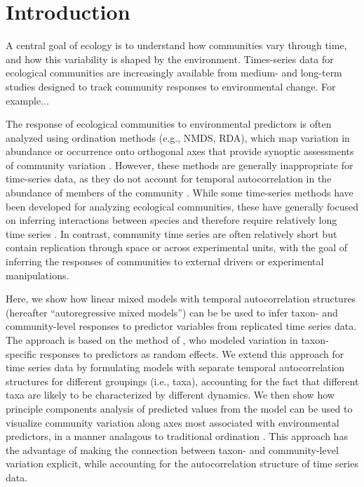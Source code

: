 \section*{Introduction}

A central goal of ecology is to understand how communities vary through time, and
how this variability is shaped by the environment.
Times-series data for ecological communities are increasingly available
from medium- and long-term studies designed to track community responses
to environmental change. For example...

The response of ecological communities to environmental predictors is often analyzed using
ordination methods (e.g., NMDS, RDA),
which map variation in abundance or occurrence onto orthogonal
axes that provide synoptic assessments of community variation \citep{Mcgarigal2013}.
However, these methods are generally inappropriate for time-series data,
as they do not account
for temporal autocorrelation in the abundance of members of the community \citep{Ives2006}.
While some time-series methods have been developed for analyzing ecological communities,
these have generally focused on inferring interactions between species and therefore
require relatively long time series \citep{Ives1999, Hampton2013}.
In contrast, community time series are often relatively short but
contain replication through space or across experimental units, with the goal of inferring
the responses of communities to external drivers or experimental manipulations.

Here, we show how linear mixed models with temporal autocorrelation structures
(hereafter ``autoregressive mixed models'') can be be used to infer taxon- and
community-level responses to predictor variables from replicated time series data. The
approach is based on the method of \cite{Jackson2012},
who modeled variation in taxon-specific responses to predictors as
random effects.
We extend this approach for time series data by formulating models with separate
temporal autocorrelation structures for different groupings (i.e., taxa),
accounting for the fact that different taxa are likely to be characterized by
different dynamics. We then show how principle components analysis of predicted values
from the model can be used to visualize
community variation along axes most associated with environmental predictors,
in a manner analagous to traditional ordination \citep{Jackson2012}.
This approach has the advantage of making the connection between
taxon- and community-level variation explicit, while accounting for the autocorrelation
structure of time series data.

